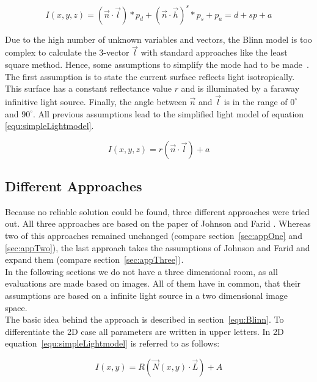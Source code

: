 \begin{equation}
\label{equ:Blinn}
I(x,y,z) = (\vec{n}\cdot \vec{l})*p_d + (\vec{n}\cdot\vec{h})^s*p_s + p_a = d + sp + a
\end{equation} 

Due to the high number of unknown variables and vectors, the Blinn model is too complex to calculate the 3-vector $\vec{l}$ with standard approaches like the least square method. Hence, some assumptions to simplify the mode had to be made~\cite{Johnson}. The first assumption is to state the current surface reflects light isotropically. This surface has a constant reflectance value $r$ and is illuminated by a faraway infinitive light source. Finally, the angle between $\vec{n}$ and  $\vec{l}$ is in the range of $0^\circ $ and $90^\circ$. All previous assumptions lead to the simplified light model of equation \ref{equ:simpleLightmodel}.

\begin{equation}
\label{equ:simpleLightmodel}
I(x,y,z) = r(\vec{n}\cdot \vec{l}) + a
\end{equation} 

\subsection{Different Approaches}\label{sec:approaches}
Because no reliable solution could be found, three different approaches were tried out. 
All three approaches are based on the paper of Johnson and Farid \cite{Johnson}. 
Whereas two of this approaches remained unchanged (compare section~\ref{sec:appOne} and \ref{sec:appTwo}), the last approach takes the assumptions of Johnson and Farid and expand them (compare section~\ref{sec:appThree}). \\
In the following sections we do not have a three dimensional room, as all evaluations are made based on images. All of them have in common, that their assumptions are based on a infinite light source in a two dimensional image space.\\
The basic idea behind the approach is described in section~\ref{equ:Blinn}. To differentiate the 2D case all parameters are written in upper letters. In 2D equation~\ref{equ:simpleLightmodel} is referred to as follows:

\begin{equation}
\label{equ:General}
I(x,y) = R(\vec{N}(x,y)\cdot \vec{L}) + A
\end{equation}

